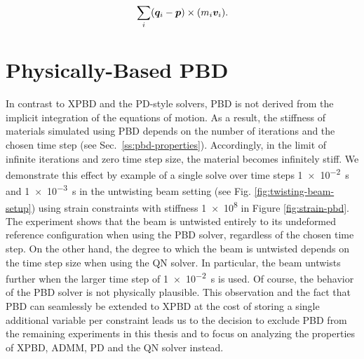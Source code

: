 \begin{equation}\label{eq:angular_momentum}
    \sum_i (\bm{q}_i - \bm{p}) \times (m_i \bm{v}_i).
\end{equation}

\section{Physically-Based PBD}\label{ss:physical-pbd}
In contrast to XPBD and the PD-style solvers, PBD is not derived from the implicit integration of the equations of motion. As a result, the stiffness of materials 
simulated using PBD depends on the number of iterations and the chosen time step (see Sec.\ \ref{ss:pbd-properties}). Accordingly, in the limit of infinite iterations and zero 
time step size, the material becomes infinitely stiff. We demonstrate this effect by example of a single solve over time steps \SI{1e-2}{\second} and \SI{1e-3}{\second} in the 
untwisting beam setting (see Fig. \ref{fig:twisting-beam-setup}) using strain constraints with stiffness \num{1e8} in Figure \ref{fig:strain-pbd}. The experiment shows that the 
beam is untwisted entirely to its undeformed reference configuration when using the PBD solver, regardless of the chosen time step. On the other hand, the degree to which the 
beam is untwisted depends on the time step size when using the QN solver. In particular, the beam untwists further when the larger time step of \SI{1e-2}{\second} 
is used. Of course, the behavior of the PBD solver is not physically plausible. This observation and the fact that PBD can seamlessly be extended to XPBD at the cost of storing 
a single additional variable per constraint leads us to the decision to exclude PBD from the remaining experiments in this thesis and to focus on analyzing the properties of 
XPBD, ADMM, PD and the QN solver instead.

